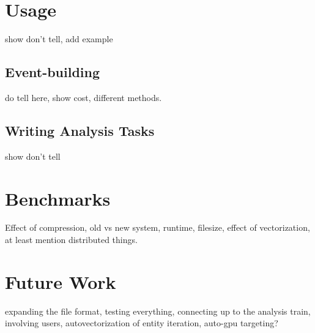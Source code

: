 \documentclass[a4paper]{report}
\begin{document}
\newpage

\section{Usage}
show don't tell, add example
\subsection{Event-building}
do tell here, show cost, different methods.
\subsection{Writing Analysis Tasks}
show don't tell

\newpage

\section{Benchmarks}
Effect of compression, old vs new system, runtime, filesize, effect of vectorization, at least mention distributed things.

\section{Future Work}
expanding the file format, testing everything, connecting up to the analysis train, involving users, autovectorization of entity iteration, auto-gpu targeting?
\end{document}
